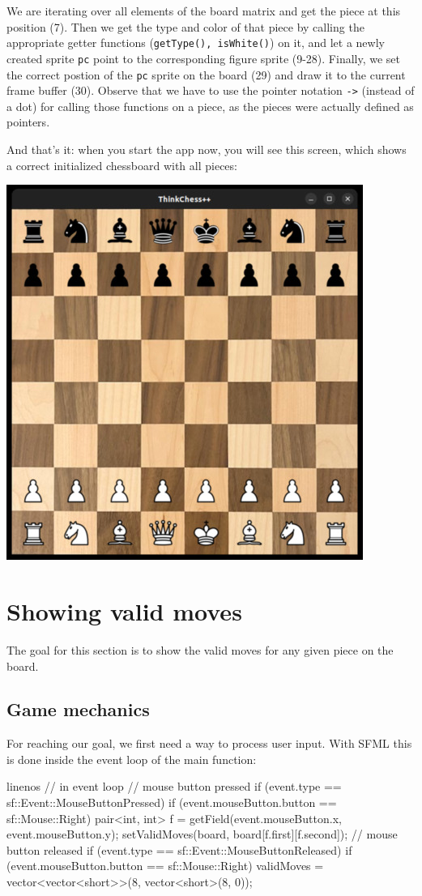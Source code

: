 We are iterating over all elements of the board matrix and get the piece at this position (7).
Then we get the type and color of that piece by calling the appropriate getter functions
(\texttt{getType(), isWhite()}) on it, and let a newly created sprite \texttt{pc}
point to the corresponding figure sprite (9-28).
Finally, we set the correct postion of the \texttt{pc} sprite on the board (29) and draw it
to the current frame buffer (30).
Observe that we have to use the pointer notation \texttt{->} (instead of a dot) for calling
those functions on a piece, as the pieces were actually defined as pointers.

And that's it: when you start the app now, you will see this screen, which shows a
correct initialized chessboard with all pieces:

\begin{center}
\includegraphics[width=.5\linewidth]{img/boardWithPieces.jpg}
\end{center}


\section{Showing valid moves}
The goal for this section is to show the valid moves for any given piece on the board.
\subsection{Game mechanics}

For reaching our goal, we first need a way to process user input.
With SFML this is done inside the event loop of the main function:

\begin{cpp*}{linenos}
      // in event loop
      // mouse button pressed
      if (event.type == sf::Event::MouseButtonPressed) {
        if (event.mouseButton.button == sf::Mouse::Right) {
          pair<int, int> f =
            getField(event.mouseButton.x, event.mouseButton.y);
          setValidMoves(board, board[f.first][f.second]);
        }
      }
      // mouse button released
      if (event.type == sf::Event::MouseButtonReleased) {
        if (event.mouseButton.button == sf::Mouse::Right) {
          validMoves =
            vector<vector<short>>(8, vector<short>(8, 0));
        }
      }
\end{cpp*}

